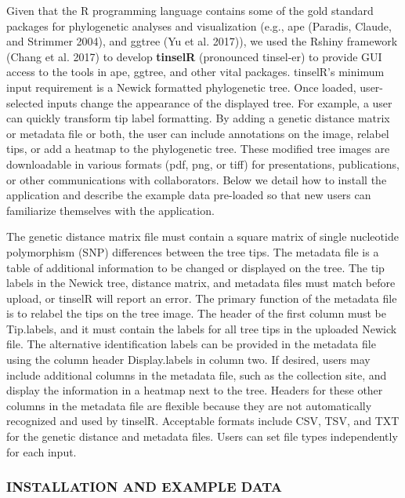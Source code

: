 \documentclass[
]{article}
\begin{document}
Given that the R programming language contains some of the gold standard
packages for phylogenetic analyses and visualization (e.g., ape
(Paradis, Claude, and Strimmer 2004), and ggtree (Yu et al. 2017)), we
used the Rshiny framework (Chang et al. 2017) to develop
\textbf{tinselR} (pronounced tinsel-er) to provide GUI access to the
tools in ape, ggtree, and other vital packages. tinselR's minimum input
requirement is a Newick formatted phylogenetic tree. Once loaded,
user-selected inputs change the appearance of the displayed tree. For
example, a user can quickly transform tip label formatting. By adding a
genetic distance matrix or metadata file or both, the user can include
annotations on the image, relabel tips, or add a heatmap to the
phylogenetic tree. These modified tree images are downloadable in
various formats (pdf, png, or tiff) for presentations, publications, or
other communications with collaborators. Below we detail how to install
the application and describe the example data pre-loaded so that new
users can familiarize themselves with the application.

The genetic distance matrix file must contain a square matrix of single
nucleotide polymorphism (SNP) differences between the tree tips. The
metadata file is a table of additional information to be changed or
displayed on the tree. The tip labels in the Newick tree, distance
matrix, and metadata files must match before upload, or tinselR will
report an error. The primary function of the metadata file is to relabel
the tips on the tree image. The header of the first column must be
Tip.labels, and it must contain the labels for all tree tips in the
uploaded Newick file. The alternative identification labels can be
provided in the metadata file using the column header Display.labels in
column two. If desired, users may include additional columns in the
metadata file, such as the collection site, and display the information
in a heatmap next to the tree. Headers for these other columns in the
metadata file are flexible because they are not automatically recognized
and used by tinselR. Acceptable formats include CSV, TSV, and TXT for
the genetic distance and metadata files. Users can set file types
independently for each input.

\hypertarget{installation-and-example-data}{%
\subsubsection{INSTALLATION AND EXAMPLE
DATA}\label{installation-and-example-data}}
\end{document}
